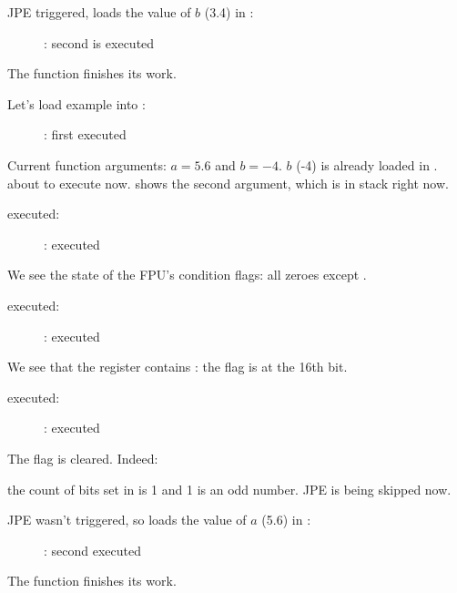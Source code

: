 \clearpage
\ac{JPE} triggered, \FLD loads the value of $b$ (3.4) in :

\begin{figure}[H]
\centering
{}
\caption{\olly: second \FLD is executed}
\label{fig:FPU_comparison_case1_olly5}
\end{figure}

The function finishes its work.

\clearpage
{}

Let's load example into \olly:

\begin{figure}[H]
\centering
{}
\caption{\olly: first \FLD executed}
\label{fig:FPU_comparison_case2_olly1}
\end{figure}

Current function arguments: $a=5.6$ and $b=-4$.
$b$ (-4) is already loaded in .
\FCOMP about to execute now. 
\olly shows the second \FCOMP argument, which is in stack right now.

\clearpage
\FCOMP executed:

\begin{figure}[H]
\centering
{}
\caption{\olly: \FCOMP executed}
\label{fig:FPU_comparison_case2_olly2}
\end{figure}

We see the state of the \ac{FPU}'s condition flags: all zeroes except \Czero.

\clearpage
\FNSTSW executed:

\begin{figure}[H]
\centering
{}
\caption{\olly: \FNSTSW executed}
\label{fig:FPU_comparison_case2_olly3}
\end{figure}

We see that the  register contains : the \Czero flag is at the 16th bit.

\clearpage
\TEST executed:

\begin{figure}[H]
\centering
{}
\caption{\olly: \TEST executed}
\label{fig:FPU_comparison_case2_olly4}
\end{figure}

The   flag is cleared.
Indeed: 

the count of bits set in  is 1 and 1 is an odd number.
\ac{JPE} is being skipped now.

\clearpage
\ac{JPE} wasn't triggered, so \FLD loads the value of $a$ (5.6) in :

\begin{figure}[H]
\centering
{}
\caption{\olly: second \FLD executed}
\label{fig:FPU_comparison_case2_olly5}
\end{figure}

The function finishes its work.
